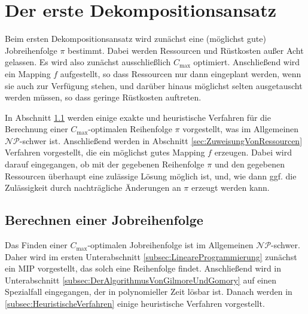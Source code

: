 \documentclass{scrreprt}
\begin{document}
\chapter{Der erste Dekompositionsansatz}
Beim ersten Dekompositionsansatz wird zunächst eine (möglichst gute) Jobreihenfolge $\pi$ bestimmt.
Dabei werden Ressourcen und Rüstkosten außer Acht gelassen. 
Es wird also zunächst ausschließlich $C_{\max}$ optimiert. Anschließend wird ein Mapping $f$ aufgestellt,
so dass Ressourcen nur dann eingeplant werden, wenn sie auch zur Verfügung stehen, und darüber hinaus
möglichst selten ausgetauscht werden müssen, so dass geringe Rüstkosten auftreten.

In Abschnitt \ref{sec:BerechnenEinerJobreihenfolge} werden einige exakte und heuristische Verfahren für die
Berechnung einer $C_{\max}$-optimalen Reihenfolge $\pi$ vorgestellt, was im Allgemeinen $\mathcal{NP}$-schwer ist.
Anschließend werden in Abschnitt \ref{sec:ZuweisungVonRessourcen} Verfahren vorgestellt, die ein möglichst gutes Mapping $f$ erzeugen.
Dabei wird darauf eingegangen, ob mit der gegebenen Reihenfolge $\pi$ und den gegebenen Ressourcen
überhaupt eine zulässige Lösung möglich ist, und, wie dann ggf. die Zulässigkeit durch nachträgliche Änderungen an $\pi$
erzeugt werden kann.

\section{Berechnen einer Jobreihenfolge}
\label{sec:BerechnenEinerJobreihenfolge}
Das Finden einer $C_{\max}$-optimalen Jobreihenfolge ist im Allgemeinen $\mathcal{NP}$-schwer.
Daher wird im ersten Unterabschnitt \ref{subsec:LineareProgrammierung} zunächst ein MIP vorgestellt,
das solch eine Reihenfolge findet.
Anschließend wird in Unterabschnitt \ref{subsec:DerAlgorithmusVonGilmoreUndGomory} auf einen Spezialfall eingegangen, der in polynomieller Zeit lösbar ist.
Danach werden in \ref{subsec:HeuristischeVerfahren} einige heuristische Verfahren vorgestellt.
\end{document}
